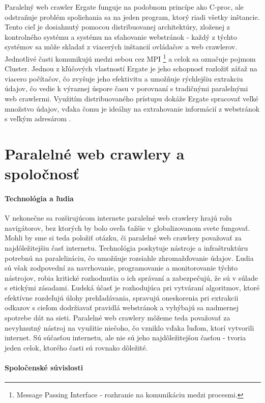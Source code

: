 \documentclass[10pt,twoside,slovak,a4paper]{article}
\begin{document}
Paralelný web crawler Ergate funguje na podobnom princípe ako C-proc, ale odstraňuje problém spoliehania sa na jeden program, ktorý riadi všetky inštancie. Tento cieľ je dosiahnutý pomocou distribuovanej architektúry, zloženej z kontrolného systému a systému na sťahovanie webstránok - každý z týchto systémov sa môže skladať z viacerých inštancií ovládačov a web crawlerov. Jednotlivé časti komunikujú medzi sebou cez MPI \footnote{Message Passing Interface - rozhranie na komunikáciu medzi procesmi.} a celok sa označuje pojmom Cluster. Jednou z kľúčových vlastností Ergate je jeho schopnosť rozložiť záťaž na viacero počítačov, čo zvyšuje jeho efektivitu a umožňuje rýchlejšiu extrakciu údajov, čo vedie k výraznej úspore času v porovnaní s tradičnými paralelnými web crawlermi. Využitím distribuovaného prístupu dokáže Ergate spracovať veľké množstvo údajov, vďaka čomu je ideálny na extrahovanie informácií z webstránok s veľkým adresárom \cite{5709184}.

\section{Paralelné web crawlery a spoločnosť}

\paragraph{Technológia a ľudia}

V nekonečne sa rozširujúcom internete paralelné web crawlery hrajú rolu navigátorov, bez ktorých by bolo oveľa ťažšie v globalizovanom svete fungovať. Mohli by sme si teda položiť otázku, či paralelné web crawlery považovať za najdôležitejšiu časť internetu. Technológia poskytuje nástroje a infraštruktúru potrebnú na paralelizáciu, čo umožňuje rozsiahle zhromažďovanie údajov. Ľudia sú však zodpovední za navrhovanie, programovanie a monitorovanie týchto nástrojov, robia kritické rozhodnutia o ich správaní a zabezpečujú, že sú v súlade s etickými zásadami. Ľudská účasť je rozhodujúca pri vytváraní algoritmov, ktoré efektívne rozdeľujú úlohy prehľadávania, spravujú oneskorenia pri extrakcii odkazov s cieľom dodržiavať pravidlá webstránok a vyhýbajú sa nadmernej spotrebe dát na sieti. Paralelné web crawlery môžeme teda považovať za nevyhnutný nástroj na využitie niečoho, čo vzniklo vďaka ľuďom, ktorí vytvorili internet. Sú súčasťou internetu, ale nie sú jeho najdôležitejšou časťou - tvoria jeden celok, ktorého časti sú rovnako dôležité.

\paragraph{Spoločenské súvislosti}
\end{document}
